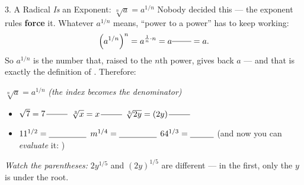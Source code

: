 \documentclass[10pt]{article}
\begin{document}
\begin{notesbox}{3. A Radical \emph{Is} an Exponent: $\sqrt[n]{a}=a^{1/n}$}
Nobody decided this --- the exponent rules \textbf{force} it. Whatever $a^{1/n}$ means, ``power to a
power'' has to keep working:
\[
  \left(a^{1/n}\right)^n = a^{\frac{1}{n}\cdot n} = a^{\blank{0.8cm}} = a .
\]
So $a^{1/n}$ is the number that, raised to the $n$th power, gives back $a$ --- and that is exactly
the definition of \blank{3.2cm}. Therefore:
\begin{center}
\begin{tcolorbox}[colback=goldbg, colframe=goldacc, boxrule=0.8pt, arc=1.5mm,
    left=3mm, right=3mm, top=1.5mm, bottom=1.5mm, width=0.62\linewidth]
\centering $\displaystyle \sqrt[n]{a} = a^{1/n}$ \qquad \emph{(the index becomes the denominator)}
\end{tcolorbox}
\end{center}
\begin{itemize}[leftmargin=1.5em, itemsep=3pt]
  \item $\sqrt{7}=7^{\,\blank{0.9cm}}$ \quad $\sqrt[3]{x}=x^{\,\blank{0.9cm}}$ \quad
        $\sqrt[5]{2y}=(2y)^{\,\blank{0.9cm}}$
  \item $11^{1/2}=\blank{1.6cm}$ \quad $m^{1/4}=\blank{1.6cm}$ \quad
        $64^{1/3}=\blank{1.0cm}$ (and now you can \emph{evaluate} it: \blank{0.8cm})
\end{itemize}
\emph{Watch the parentheses:} $2y^{1/5}$ and $(2y)^{1/5}$ are different --- in the first, only the
$y$ is under the root.
\end{notesbox}
\end{document}
